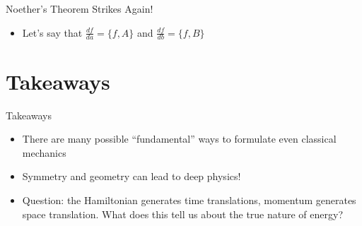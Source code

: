 \documentclass[10pt,xcolor={table,dvipsnames},t]{beamer}
\begin{document}
\begin{frame}{Noether's Theorem Strikes Again!}
    \begin{itemize}
        \item Let's say that $\frac{df}{d a} = \{f,A\}$ and $\frac{df}{db} = \{f,B\}$
    \end{itemize}
\end{frame}

\section{Takeaways}

\begin{frame}{Takeaways}

\begin{itemize}
    \item There are many possible ``fundamental'' ways to formulate even classical mechanics
    \item Symmetry and geometry can lead to deep physics!
    \item Question: the Hamiltonian generates time translations, momentum generates space translation. What does this tell us about the true nature of energy?
\end{itemize}

    \hspace{100pt}
    
    \begin{figure}
    \centering
    \def\omu{13}
    \def\oml{-7}
    \label{fig:progress}
\end{figure}

\end{frame}
\end{document}
